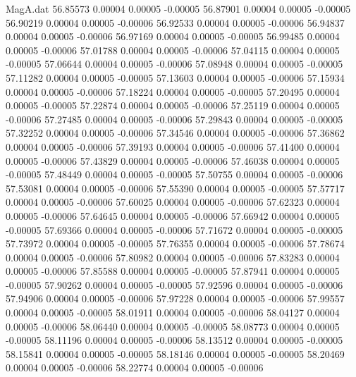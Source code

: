 \begin{filecontents}{MagA.dat}
  56.85573    0.00004    0.00005   -0.00005
  56.87901    0.00004    0.00005   -0.00005
  56.90219    0.00004    0.00005   -0.00006
  56.92533    0.00004    0.00005   -0.00006
  56.94837    0.00004    0.00005   -0.00006
  56.97169    0.00004    0.00005   -0.00005
  56.99485    0.00004    0.00005   -0.00006
  57.01788    0.00004    0.00005   -0.00006
  57.04115    0.00004    0.00005   -0.00005
  57.06644    0.00004    0.00005   -0.00006
  57.08948    0.00004    0.00005   -0.00005
  57.11282    0.00004    0.00005   -0.00005
  57.13603    0.00004    0.00005   -0.00006
  57.15934    0.00004    0.00005   -0.00006
  57.18224    0.00004    0.00005   -0.00005
  57.20495    0.00004    0.00005   -0.00005
  57.22874    0.00004    0.00005   -0.00006
  57.25119    0.00004    0.00005   -0.00006
  57.27485    0.00004    0.00005   -0.00006
  57.29843    0.00004    0.00005   -0.00005
  57.32252    0.00004    0.00005   -0.00006
  57.34546    0.00004    0.00005   -0.00006
  57.36862    0.00004    0.00005   -0.00006
  57.39193    0.00004    0.00005   -0.00006
  57.41400    0.00004    0.00005   -0.00006
  57.43829    0.00004    0.00005   -0.00006
  57.46038    0.00004    0.00005   -0.00005
  57.48449    0.00004    0.00005   -0.00005
  57.50755    0.00004    0.00005   -0.00006
  57.53081    0.00004    0.00005   -0.00006
  57.55390    0.00004    0.00005   -0.00005
  57.57717    0.00004    0.00005   -0.00006
  57.60025    0.00004    0.00005   -0.00006
  57.62323    0.00004    0.00005   -0.00006
  57.64645    0.00004    0.00005   -0.00006
  57.66942    0.00004    0.00005   -0.00005
  57.69366    0.00004    0.00005   -0.00006
  57.71672    0.00004    0.00005   -0.00005
  57.73972    0.00004    0.00005   -0.00005
  57.76355    0.00004    0.00005   -0.00006
  57.78674    0.00004    0.00005   -0.00006
  57.80982    0.00004    0.00005   -0.00006
  57.83283    0.00004    0.00005   -0.00006
  57.85588    0.00004    0.00005   -0.00005
  57.87941    0.00004    0.00005   -0.00005
  57.90262    0.00004    0.00005   -0.00005
  57.92596    0.00004    0.00005   -0.00006
  57.94906    0.00004    0.00005   -0.00006
  57.97228    0.00004    0.00005   -0.00006
  57.99557    0.00004    0.00005   -0.00005
  58.01911    0.00004    0.00005   -0.00006
  58.04127    0.00004    0.00005   -0.00006
  58.06440    0.00004    0.00005   -0.00005
  58.08773    0.00004    0.00005   -0.00005
  58.11196    0.00004    0.00005   -0.00006
  58.13512    0.00004    0.00005   -0.00005
  58.15841    0.00004    0.00005   -0.00005
  58.18146    0.00004    0.00005   -0.00005
  58.20469    0.00004    0.00005   -0.00006
  58.22774    0.00004    0.00005   -0.00006

\end{filecontents}
